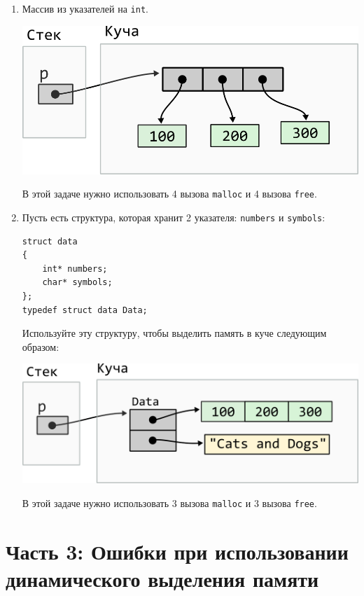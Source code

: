 \documentclass{article}
\begin{document}
\begin{enumerate}
\item Массив из указателей на \texttt{int}.
\begin{center}
\includegraphics[scale=0.83]{../images/malloc_class_tasks/heap_pointer_array.png}
\end{center}
В этой задаче нужно использовать 4 вызова \texttt{malloc} и 4 вызова \texttt{free}.

\item Пусть есть структура, которая хранит 2 указателя: \texttt{numbers} и \texttt{symbols}:
\begin{lstlisting}
struct data 
{
    int* numbers;
    char* symbols;
};
typedef struct data Data;
\end{lstlisting}

Используйте эту структуру, чтобы выделить память в куче следующим образом:
\begin{center}
\includegraphics[scale=0.83]{../images/malloc_class_tasks/heap_struct_with_pointers.png}
\end{center}
В этой задаче нужно использовать 3 вызова \texttt{malloc} и 3 вызова \texttt{free}.
\end{enumerate}


\newpage
\section*{Часть 3: Ошибки при использовании динамического выделения памяти}
\end{document}
